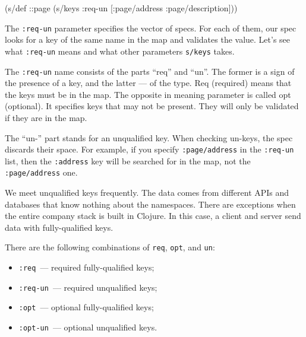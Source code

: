 \begin{english}
  \begin{clojure}
(s/def ::page
  (s/keys :req-un [:page/address
                   :page/description]))
  \end{clojure}
\end{english}


The \verb|:req-un| parameter specifies the vector of specs. For each of them, our spec looks for a key of the same name in the map and validates the value. Let's see what \verb|:req-un| means and what other parameters \verb|s/keys| takes.

The \verb|:req-un| name consists of the parts “req” and “un”. The former is a sign of the presence of a key, and the latter — of the type. Req (required) means that the keys must be in the map. The opposite in meaning parameter is called opt (optional). It specifies keys that may not be present. They will only be validated if they are in the map.


The “un-” part stands for an unqualified key. When checking un-keys, the spec discards their space. For example, if you specify \verb|:page/address| in the \verb|:req-un| list, then the \verb|:address| key will be searched for in the map, not the \verb|:page/address| one.

We meet unqualified keys frequently. The data comes from different APIs and databases that know nothing about the namespaces. There are exceptions when the entire company stack is built in Clojure. In this case, a client and server send data with fully-qualified keys. 

There are the following combinations of  \verb|req|, \verb|opt|, and \verb|un|:

\begin{itemize}

\item
  \verb|:req|~--- required fully-qualified keys;

\item
  \verb|:req-un|~--- required unqualified keys;


\item
  \verb|:opt|~--- optional fully-qualified keys;


\item
  \verb|:opt-un|~--- optional unqualified keys.

\end{itemize}

